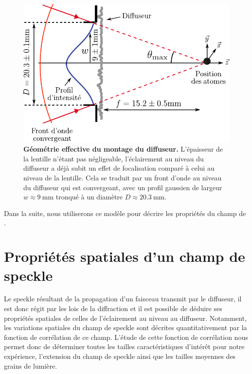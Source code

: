\begin{figure}
\centering
\includegraphics[scale=0.9]{Fig/Speckle/geometrie_effective_speckle.pdf}
\caption{\textbf{Géométrie effective du montage du diffuseur.} L'épaisseur de la lentille n'étant pas négligeable, l'éclairement au niveau du diffuseur a déjà subit un effet de focalisation comparé à celui au niveau de la lentille. Cela se traduit par un front d'onde au niveau du diffuseur qui est convergeant, avec un profil gaussien de largeur $w\approx\SI{9}{\milli\metre}$ tronqué à un diamètre $D\approx\SI{20.3}{\milli\metre}$.}
\label{fig:geometrie_effective_speckle}
\end{figure}

Dans la suite, nous utiliserons ce modèle pour décrire les propriétés du champ de \speckle .






\section{Propriétés spatiales d'un champ de speckle}
\label{sc:speckle_correlation}

Le speckle résultant de la propagation d'un faisceau transmit par le diffuseur, il est donc régit par les lois de la diffraction et il est possible de déduire ses propriétés spatiales de celles de l'éclairement au niveau au diffuseur. Notamment, les variations spatiales du champ de speckle sont décrites quantitativement par la fonction de corrélation de ce champ. L'étude de cette fonction de corrélation nous permet donc de déterminer toutes les tailles caractéristiques d'intérêt pour notre expérience, l'extension du champ de speckle ainsi que les tailles moyennes des grains de lumière. 

